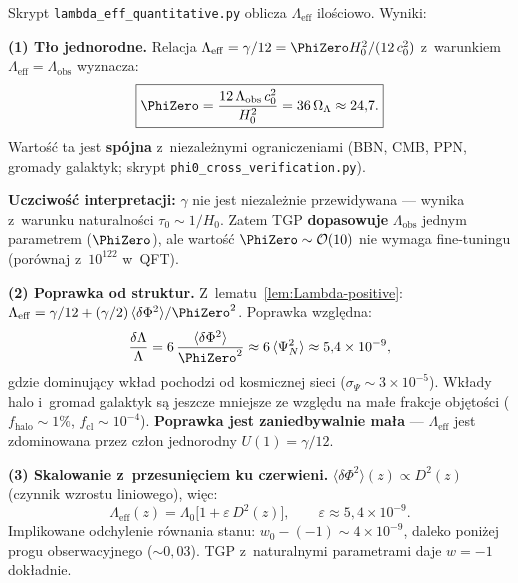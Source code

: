 \begin{remark}\label{rem:Lambda-quantitative}
Skrypt \texttt{lambda\_eff\_quantitative.py} oblicza
$\Lambda_{\mathrm{eff}}$ ilo\'sciowo. Wyniki:

\medskip\noindent
\textbf{(1) T\l{}o jednorodne.}
Relacja $\Lambda_{\mathrm{eff}} = \gamma/12 = \PhiZero H_0^2/(12\,c_0^2)$
z~warunkiem $\Lambda_{\mathrm{eff}} = \Lambda_{\mathrm{obs}}$ wyznacza:
\begin{equation}\label{eq:Phi0-from-Lambda}
  \boxed{
    \PhiZero = \frac{12\,\Lambda_{\mathrm{obs}}\,c_0^2}{H_0^2}
    = 36\,\Omega_\Lambda
    \approx 24{,}7.
  }
\end{equation}
Warto\'s\'c ta jest \textbf{sp\'ojna} z~niezale\.znymi
ograniczeniami (BBN, CMB, PPN, gromady galaktyk;
skrypt \texttt{phi0\_cross\_verification.py}).

\medskip\noindent
\textbf{Uczciwo\'s\'c interpretacji:} $\gamma$ nie jest
niezale\.znie przewidywana --- wynika z~warunku naturalno\'sci
$\tau_0 \sim 1/H_0$. Zatem TGP \textbf{dopasowuje}
$\Lambda_{\mathrm{obs}}$ jednym parametrem ($\PhiZero$),
ale warto\'s\'c $\PhiZero \sim \mathcal{O}(10)$ nie wymaga
fine-tuningu (por\'ownaj z~$10^{122}$ w~QFT).

\medskip\noindent
\textbf{(2) Poprawka od struktur.}
Z~lematu~\ref{lem:Lambda-positive}:
$\Lambda_{\mathrm{eff}} = \gamma/12 + (\gamma/2)\,
\langle\delta\Phi^2\rangle/\PhiZero^2$.
Poprawka wzgl\k{e}dna:
\[
  \frac{\delta\Lambda}{\Lambda}
  = 6\,\frac{\langle\delta\Phi^2\rangle}{\PhiZero^2}
  \approx 6\,\langle\Psi_N^2\rangle
  \approx 5{,}4 \times 10^{-9},
\]
gdzie dominuj\k{a}cy wk\l{}ad pochodzi od kosmicznej sieci
($\sigma_\Psi \sim 3 \times 10^{-5}$). Wk\l{}ady halo
i~gromad galaktyk s\k{a} jeszcze mniejsze ze wzgl\k{e}du
na ma\l{}e frakcje obj\k{e}to\'sci ($f_{\mathrm{halo}} \sim 1\%$,
$f_{\mathrm{cl}} \sim 10^{-4}$).
\textbf{Poprawka jest zaniedbywalnie ma\l{}a} ---
$\Lambda_{\mathrm{eff}}$ jest zdominowana przez cz\l{}on
jednorodny $U(1) = \gamma/12$.

\medskip\noindent
\textbf{(3) Skalowanie z~przesuni\k{e}ciem ku czerwieni.}
$\langle\delta\Phi^2\rangle(z) \propto D^2(z)$
(czynnik wzrostu liniowego), wi\k{e}c:
\[
  \Lambda_{\mathrm{eff}}(z)
  = \Lambda_0\bigl[1 + \varepsilon\,D^2(z)\bigr],
  \qquad
  \varepsilon \approx 5{,}4 \times 10^{-9}.
\]
Implikowane odchylenie r\'ownania stanu:
$w_0 - (-1) \sim 4 \times 10^{-9}$,
daleko poni\.zej progu obserwacyjnego ($\sim 0{,}03$).
TGP z~naturalnymi parametrami daje $w = -1$ dok\l{}adnie.


\end{remark}
